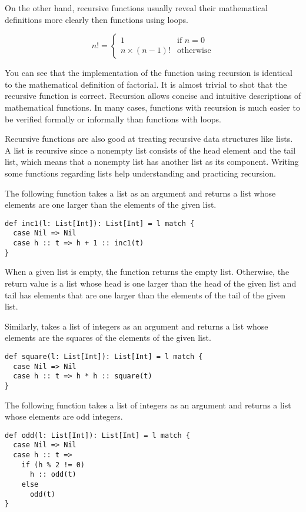 On the other hand,
recursive functions usually reveal their mathematical definitions more clearly
then functions using loops.

\[n!=\begin{cases}1 & \text{if } n=0\\n \times (n-1)! &
\text{otherwise}\end{cases}\]

You can see that the implementation of the  function using recursion
is identical to the mathematical definition of factorial. It is almost trivial
to shot that the recursive  function is correct.
Recursion allows concise and intuitive descriptions of mathematical functions.
In many cases, functions with recursion is much easier to be verified formally
or informally than functions with loops.

Recursive functions are also good at treating recursive data structures like
lists. A list is recursive since a nonempty list consists of the head element
and the tail list, which means that a nonempty list has another list as its component.
Writing some functions regarding lists help understanding and practicing
recursion.

The following function takes a list as an argument and returns a list whose
elements are one larger than the elements of the given list.

\begin{verbatim}
def inc1(l: List[Int]): List[Int] = l match {
  case Nil => Nil
  case h :: t => h + 1 :: inc1(t)
}
\end{verbatim}

When a given list is empty, the function returns the empty list. Otherwise, the
return value is a list whose head is one larger than the head of the given list
and tail has elements that are one larger than the elements of the tail of the
given list.

Similarly,  takes a list of integers as an argument and returns a
list whose elements are the squares of the elements of the given list.

\begin{verbatim}
def square(l: List[Int]): List[Int] = l match {
  case Nil => Nil
  case h :: t => h * h :: square(t)
}
\end{verbatim}

The following function takes a list of integers as an argument and returns a list whose
elements are odd integers.

\begin{verbatim}
def odd(l: List[Int]): List[Int] = l match {
  case Nil => Nil
  case h :: t =>
    if (h % 2 != 0)
      h :: odd(t)
    else
      odd(t)
}
\end{verbatim}

